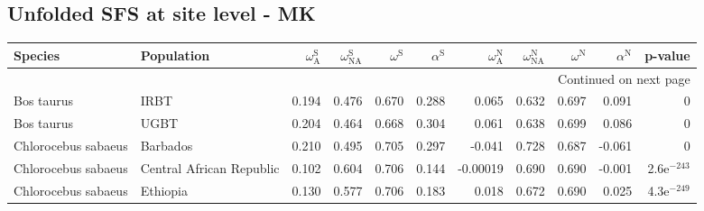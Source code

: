 \subsection{Unfolded SFS at site level - MK} 
\begin{longtable}{llrrrrrrrrr}
\toprule
             Species &                Population & $\omega_{\textrm{A}}^{\textrm{S}}$ & $\omega_{\textrm{NA}}^{\textrm{S}}$ & $\omega^{\textrm{S}}$ & $\alpha^{\textrm{S}}$ & $\omega_{\textrm{A}}^{\textrm{N}}$ & $\omega_{\textrm{NA}}^{\textrm{N}}$ & $\omega^{\textrm{N}}$ & $\alpha^{\textrm{N}}$ &       p-value \\
\midrule
\endhead
\midrule
\multicolumn{11}{r}{{Continued on next page}} \\
\midrule
\endfoot

\bottomrule
\endlastfoot
          Bos taurus &                      IRBT &                              0.194 &                               0.476 &                 0.670 &                 0.288 &                              0.065 &                               0.632 &                 0.697 &                 0.091 &             0 \\
          Bos taurus &                      UGBT &                              0.204 &                               0.464 &                 0.668 &                 0.304 &                              0.061 &                               0.638 &                 0.699 &                 0.086 &             0 \\
 Chlorocebus sabaeus &                  Barbados &                              0.210 &                               0.495 &                 0.705 &                 0.297 &                             -0.041 &                               0.728 &                 0.687 &                -0.061 &             0 \\
 Chlorocebus sabaeus &  Central African Republic &                              0.102 &                               0.604 &                 0.706 &                 0.144 &                           -0.00019 &                               0.690 &                 0.690 &                -0.001 & 2.6e$^{-243}$ \\
 Chlorocebus sabaeus &                  Ethiopia &                              0.130 &                               0.577 &                 0.706 &                 0.183 &                              0.018 &                               0.672 &                 0.690 &                 0.025 & 4.3e$^{-249}$ \\

\end{longtable}
